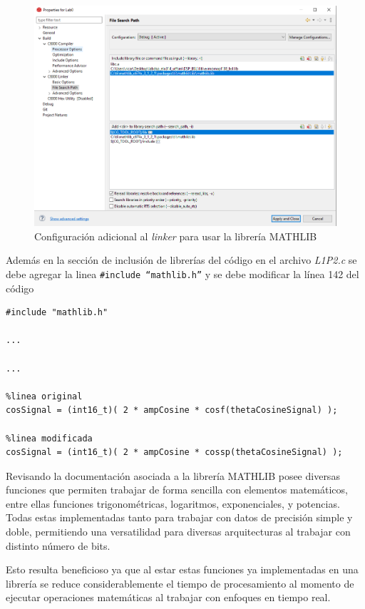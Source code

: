 \begin{figure}[H]
    \centering
    \includegraphics[scale = 0.6]{figures/mathlib_linker.png}
    \caption{Configuración adicional al \textit{linker} para usar la librería MATHLIB}
    \label{linker_mathlib}
\end{figure}

Además en la sección de inclusión de librerías del código en el archivo \textit{L1P2.c} se debe agregar la linea \texttt{\#include  ``mathlib.h''} y se debe modificar la línea 142 del código


\begin{lstlisting}[frame = single]
#include "mathlib.h"

...

...

%linea original
cosSignal = (int16_t)( 2 * ampCosine * cosf(thetaCosineSignal) );

%linea modificada
cosSignal = (int16_t)( 2 * ampCosine * cossp(thetaCosineSignal) );
\end{lstlisting}


Revisando la documentación asociada a la librería MATHLIB posee diversas funciones que permiten trabajar de forma sencilla con elementos matemáticos, entre ellas funciones trigonométricas, logaritmos, exponenciales, y potencias. Todas estas implementadas tanto para trabajar con datos de precisión simple y doble, permitiendo una versatilidad para diversas arquitecturas al trabajar con distinto número de bits.

Esto resulta beneficioso ya que al estar estas funciones ya implementadas en una librería se reduce considerablemente el tiempo de procesamiento al momento de ejecutar operaciones matemáticas al trabajar con enfoques en tiempo real.



